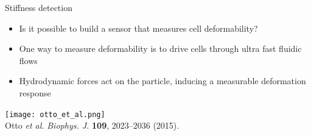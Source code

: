 
\begin{frame}[c]{Stiffness detection}

	\begin{itemize}
		\item Is it possible to build a sensor that measures cell deformability?
		\item One way to measure deformability is to drive cells through ultra fast fluidic flows
		\item Hydrodynamic forces act on the particle, inducing a measurable deformation response
	\end{itemize}
	
	\vspace{.1in}
	
	{\centering
		\texttt{[image: otto\_et\_al.png]} \\
		{\tiny Otto \textit{et al.} \textit{Biophys. J.} \textbf{109}, 2023--2036 (2015).} \\
		\par
	}
	
	
\end{frame}



